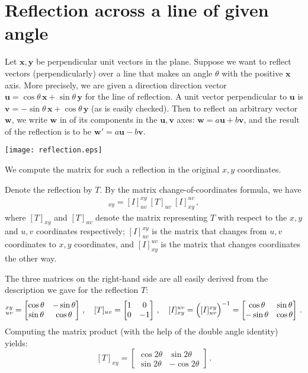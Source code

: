\documentclass[12pt]{article}
\newcommand{\vx}{\mathbf{x}}
\newcommand{\vy}{\mathbf{y}}
\newcommand{\vu}{\mathbf{u}}
\newcommand{\vv}{\mathbf{v}}
\newcommand{\vw}{\mathbf{w}}
\begin{document}
\section*{Reflection across a line of given angle}
Let $\vx, \vy$ be perpendicular unit vectors in the plane.
Suppose we want to reflect vectors (perpendicularly) over a line that makes an angle $\theta$ with
the positive $\vx$ axis.  More precisely, we are given
a direction direction vector $\vu = \cos \theta \, \vx + \sin \theta \, \vy$ for the line of reflection.
A unit vector perpendicular to $\vu$ is $\vv = -\sin \theta \, \vx + \cos \theta \, \vy$
(as is easily checked).  Then to reflect an arbitrary vector $\vw$,
we write $\vw$ in  of its components in the $\vu, \vv$ axes:
$\vw = a\vu + b \vv$, and the result of the reflection is to be $\vw' = a\vu - b \vv$.

\begin{center}
\texttt{[image: reflection.eps]}
\end{center}

We compute the matrix for such a reflection in the original $x,y$ coordinates.

Denote the reflection by $T$.  By the matrix change-of-coordinates formula,
we have
\begin{align*}
[ T ]_{xy} = [I]_{uv}^{xy} \: [T]_{uv} \: [I]_{xy}^{uv}\,,
\end{align*}
where $[T]_{xy}$ and $[T]_{uv}$ denote the matrix representing $T$ with
respect to the $x,y$ and $u,v$ coordinates respectively; $[I]_{uv}^{xy}$ is the
matrix that changes from $u,v$ coordinates to $x,y$ coordinates, and $[I]_{xy}^{uv}$ is the matrix that changes coordinates the other way.

The three matrices on the right-hand side are all easily derived
from the description we gave for the reflection $T$:
\begin{align*}
[I]_{uv}^{xy} = \begin{bmatrix}
\cos \theta & -\sin \theta \\
\sin \theta & \cos \theta
\end{bmatrix}\,, \quad
[T]_{uv} = \begin{bmatrix}
1 & 0 \\
0 & -1
\end{bmatrix}\,,
\quad 
[I]_{xy}^{uv} = \Bigl( [I]_{uv}^{xy} \Bigr)^{-1} = 
\begin{bmatrix}
\cos \theta & \sin \theta \\
-\sin \theta & \cos \theta
\end{bmatrix}\,.
\end{align*}
Computing the matrix product (with the help of the double angle identity) yields:
\begin{equation}\label{theta-matrix}
[T]_{xy} = \begin{bmatrix}
\cos 2\theta & \sin 2\theta \\
\sin 2\theta & -\cos 2\theta
\end{bmatrix}\,.
\end{equation}
\end{document}
